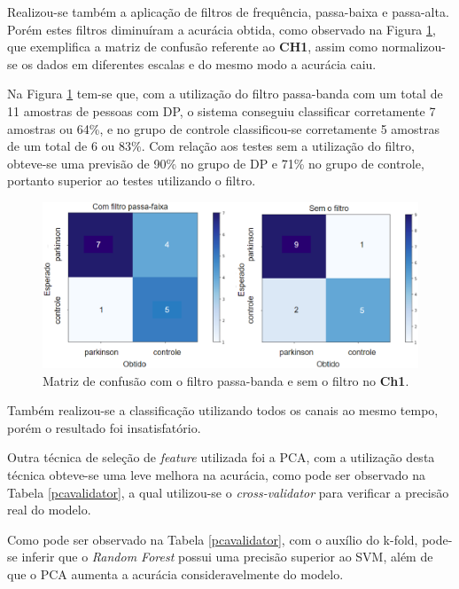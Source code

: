 Realizou-se também a aplicação de filtros de frequência, passa-baixa e passa-alta. Porém estes filtros diminuíram a acurácia obtida, como observado na Figura \ref{comesemfiltro}, que exemplifica a matriz de confusão referente ao \textbf{CH1}, assim como normalizou-se os dados em diferentes escalas e do mesmo modo a acurácia caiu. 

Na Figura \ref{comesemfiltro} tem-se que, com a utilização do filtro passa-banda com um total de 11 amostras de pessoas com DP, o sistema conseguiu classificar corretamente 7 amostras ou 64\%, e no grupo de controle classificou-se corretamente 5 amostras de um total de 6 ou 83\%. Com relação aos testes sem a utilização do filtro, obteve-se uma previsão de 90\% no grupo de DP e 71\% no grupo de controle, portanto superior ao testes utilizando o filtro.

\begin{figure}[t]
    \centering
    \includegraphics[width=1\textwidth]{figuras/comesemfiltro.eps}
    \caption{Matriz de confusão com o filtro passa-banda e sem o filtro no \textbf{Ch1}.}
    \label{comesemfiltro}
\end{figure}

Também realizou-se a classificação utilizando todos os canais ao mesmo tempo, porém o resultado foi insatisfatório.

Outra técnica de seleção de \textit{feature} utilizada foi a PCA, com a utilização desta técnica obteve-se uma leve melhora na acurácia, como pode ser observado na Tabela \ref{pcavalidator}, a qual utilizou-se o \textit{cross-validator} para verificar a precisão real do modelo.

Como pode ser observado na Tabela \ref{pcavalidator}, com o auxílio do k-fold, pode-se inferir que o \textit{Random Forest} possui uma precisão superior ao SVM, além de que o PCA aumenta a acurácia consideravelmente do modelo.


